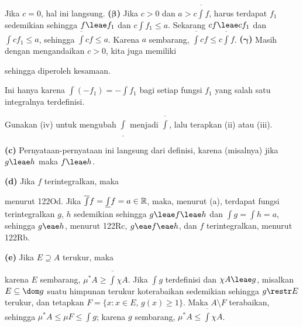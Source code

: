 {\medskip

 Jika $c=0$, hal ini langsung. {\bf
($\pmb{\beta}$)} Jika $c>0$ dan $a>c\overline{\int}f$, harus terdapat
$f_1$ sedemikian sehingga $f\leae f_1$ dan $c\int f_1\le a$. Sekarang
$cf\leae cf_1$ dan $\int cf_1\le a$, sehingga $\overline{\int}cf\le a$.
Karena $a$ sembarang, $\overline{\int}cf\le c\overline{\int}f$.
{\bf($\pmb{\gamma}$)} Masih dengan mengandaikan $c>0$, kita juga memiliki


\noindent sehingga diperoleh kesamaan.

\medskip

 Ini hanya karena $\int(-f_1)=-\int f_1$ bagi setiap fungsi
$f_1$ yang salah satu integralnya terdefinisi.

\medskip

 Gunakan (iv) untuk mengubah $\underline{\int}$ menjadi
$\overline{\int}$, lalu terapkan (ii) atau (iii).

\medskip

{\bf (c)} Pernyataan-pernyataan ini langsung dari definisi, karena
(misalnya) jika $g\leae h$ maka $f\leae h$.

\medskip

{\bf (d)} Jika $f$ terintegralkan, maka


\noindent menurut 122Od. Jika
$\overline{\int}f=\underline{\int}f=a\in\Bbb R$, maka, menurut (a), terdapat
fungsi terintegralkan $g$, $h$ sedemikian sehingga $g\leae f\leae h$ dan
$\int g=\int h=a$, sehingga $g\eae h$, menurut 122Rc, $g\eae f\eae h$,
dan $f$ terintegralkan, menurut 122Rb.

\medskip

{\bf (e)} Jika $E\supseteq A$ terukur, maka


\noindent karena $E$ sembarang, $\mu^*A\ge\overline{\int}\chi A$.
Jika $\int g$ terdefinisi dan $\chi A\leae g$, misalkan $E\subseteq\dom g$
suatu himpunan terukur koterabaikan sedemikian sehingga $g\restr E$ terukur,
dan tetapkan $F=\{x:x\in E$, $g(x)\ge 1\}$. Maka $A\setminus F$
terabaikan, sehingga $\mu^*A\le\mu F\le\int g$; karena $g$ sembarang,
$\mu^*A\le\overline{\int}\chi A$.
}%


